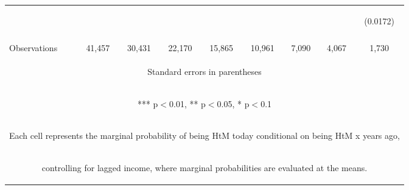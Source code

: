 \begin{center}
\begin{tabular}{lcccccccc}
 & \begin{footnotesize}\end{footnotesize} & \begin{footnotesize}\end{footnotesize} & \begin{footnotesize}\end{footnotesize} & \begin{footnotesize}\end{footnotesize} & \begin{footnotesize}\end{footnotesize} & \begin{footnotesize}\end{footnotesize} & \begin{footnotesize}\end{footnotesize} & \begin{footnotesize}(0.0172)\end{footnotesize} \\
\vspace{4pt} & \begin{footnotesize}\end{footnotesize} & \begin{footnotesize}\end{footnotesize} & \begin{footnotesize}\end{footnotesize} & \begin{footnotesize}\end{footnotesize} & \begin{footnotesize}\end{footnotesize} & \begin{footnotesize}\end{footnotesize} & \begin{footnotesize}\end{footnotesize} & \begin{footnotesize}\end{footnotesize} \\
 Observations & 41,457 & 30,431 & 22,170 & 15,865 & 10,961 & 7,090 & 4,067 & 1,730 \\ \hline
\multicolumn{9}{c}{\begin{footnotesize} Standard errors in parentheses\end{footnotesize}} \\
\multicolumn{9}{c}{\begin{footnotesize} *** p$<$0.01, ** p$<$0.05, * p$<$0.1\end{footnotesize}} \\
\multicolumn{9}{c}{\begin{footnotesize} Each cell represents the marginal probability of being HtM today conditional on being HtM x years ago,\end{footnotesize}} \\
\multicolumn{9}{c}{\begin{footnotesize} controlling for lagged income, where marginal probabilities are evaluated at the means.\end{footnotesize}} \\
\end{tabular}
\end{center}
